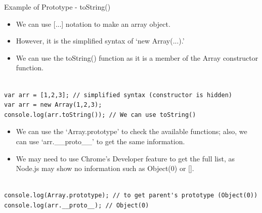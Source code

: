 \begin{frame}[fragile]{Example of Prototype - toString()}

\begin{itemize}
	\item We can use [...] notation to make an array object.
	\item However, it is the simplified syntax of `new Array(...).'
	\item We can use the toString() function as it is a member of the Array constructor function. 
\end{itemize}

\begin{Code}{}%
\begin{lstlisting}[firstnumber=1, label=glabels, xleftmargin=0pt, basicstyle=\scriptsize]% 

var arr = [1,2,3]; // simplified syntax (constructor is hidden)
var arr = new Array(1,2,3);
console.log(arr.toString()); // We can use toString()
\end{lstlisting}%
\end{Code}%

\end{frame}

\begin{frame}[fragile]{}

\begin{itemize}
	\item We can use the `Array.prototype' to check the available functions; also, we can use `arr.\_\_proto\_\_' to get the same information. 
	\item We may need to use Chrome's Developer feature to get the full list, as Node.js may show no information such as Object(0) or []. 
\end{itemize}

\begin{Code}{}%
\begin{lstlisting}[firstnumber=1, label=glabels, xleftmargin=0pt, basicstyle=\scriptsize]% 

console.log(Array.prototype); // to get parent's prototype (Object(0))
console.log(arr.__proto__); // Object(0)
\end{lstlisting}%
\end{Code}%

\end{frame}

